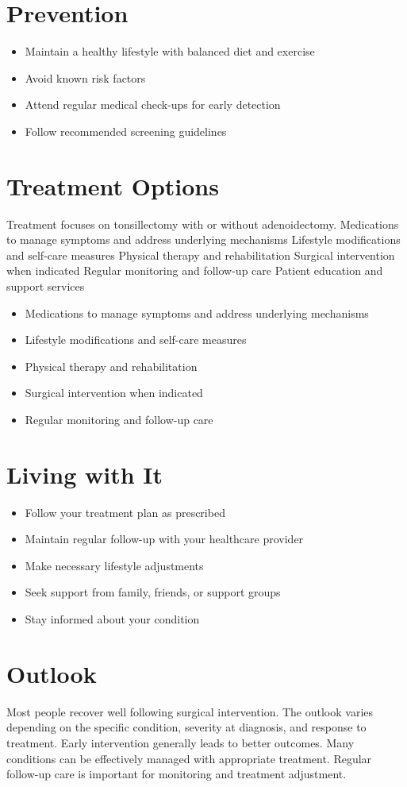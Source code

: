 \section{Prevention}
\begin{itemize}[noitemsep]
  \item Maintain a healthy lifestyle with balanced diet and exercise
  \item Avoid known risk factors
  \item Attend regular medical check-ups for early detection
  \item Follow recommended screening guidelines
\end{itemize}
\section{Treatment Options}
Treatment focuses on tonsillectomy with or without adenoidectomy. Medications to manage symptoms and address underlying mechanisms Lifestyle modifications and self-care measures Physical therapy and rehabilitation Surgical intervention when indicated Regular monitoring and follow-up care Patient education and support services

\begin{itemize}[noitemsep]
  \item Medications to manage symptoms and address underlying mechanisms
  \item Lifestyle modifications and self-care measures
  \item Physical therapy and rehabilitation
  \item Surgical intervention when indicated
  \item Regular monitoring and follow-up care
\end{itemize}
\section{Living with It}
\begin{itemize}[noitemsep]
  \item Follow your treatment plan as prescribed
  \item Maintain regular follow-up with your healthcare provider
  \item Make necessary lifestyle adjustments
  \item Seek support from family, friends, or support groups
  \item Stay informed about your condition
\end{itemize}
\section{Outlook}
Most people recover well following surgical intervention. The outlook varies depending on the specific condition, severity at diagnosis, and response to treatment. Early intervention generally leads to better outcomes. Many conditions can be effectively managed with appropriate treatment. Regular follow-up care is important for monitoring and treatment adjustment.
